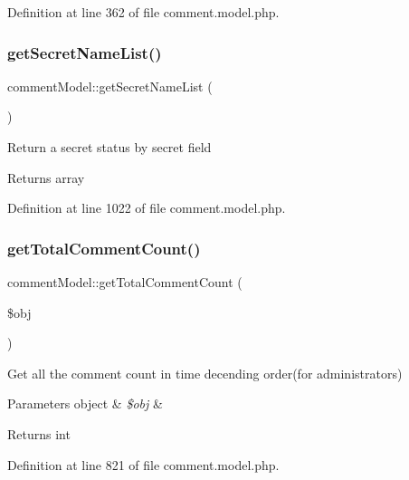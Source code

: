 Definition at line 362 of file comment.\+model.\+php.

\mbox{\label{classcommentModel_ad05dafe1e96d761873a0b772eb1f749a}} 
\subsubsection{\texorpdfstring{get\+Secret\+Name\+List()}{getSecretNameList()}}
{\footnotesize\ttfamily comment\+Model\+::get\+Secret\+Name\+List (\begin{DoxyParamCaption}{ }\end{DoxyParamCaption})}

Return a secret status by secret field \begin{DoxyReturn}{Returns}
array 
\end{DoxyReturn}


Definition at line 1022 of file comment.\+model.\+php.

\mbox{\label{classcommentModel_a1854f15efa75a16e2edd603167d05e93}} 
\subsubsection{\texorpdfstring{get\+Total\+Comment\+Count()}{getTotalCommentCount()}}
{\footnotesize\ttfamily comment\+Model\+::get\+Total\+Comment\+Count (\begin{DoxyParamCaption}\item[{}]{\$obj }\end{DoxyParamCaption})}

Get all the comment count in time decending order(for administrators) 
\begin{DoxyParams}[1]{Parameters}
object & {\em \$obj} & \\
\hline
\end{DoxyParams}
\begin{DoxyReturn}{Returns}
int 
\end{DoxyReturn}


Definition at line 821 of file comment.\+model.\+php.

